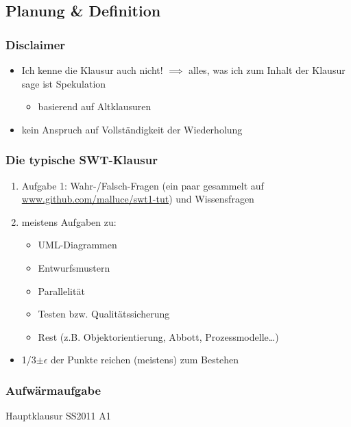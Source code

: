 \documentclass[18pt]{beamer}
\begin{document}
	\subsection{Planung \& Definition}
	\begin{frame}
		\frametitle{Disclaimer}
		\begin{large}
			\begin{itemize}
				\item Ich kenne die Klausur auch nicht! \pause
				\linebreak $\implies$ alles, was ich zum Inhalt der Klausur sage ist Spekulation
				\begin{itemize}
					\item basierend auf Altklausuren \pause
				\end{itemize}
				\item kein Anspruch auf Vollständigkeit der Wiederholung
			\end{itemize}
		\end{large}
	\end{frame}

	\begin{frame}
		\frametitle{Die typische SWT-Klausur}
		\begin{enumerate}
			\item Aufgabe 1: Wahr-/Falsch-Fragen (ein paar gesammelt auf \url{www.github.com/malluce/swt1-tut})
			 und Wissensfragen\pause
			\item meistens Aufgaben zu:
			\begin{itemize}
				\item UML-Diagrammen \pause
				\item Entwurfsmustern \pause
				\item Parallelität \pause
				\item Testen bzw. Qualitätssicherung \pause
				\item Rest (z.B. Objektorientierung, Abbott, Prozessmodelle\dots) \pause
			\end{itemize}
		\end{enumerate}
		\begin{itemize}
			\item 1/3$\pm \epsilon$ der Punkte reichen (meistens) zum Bestehen
		\end{itemize}
	\end{frame}

	\begin{frame}
		\frametitle{Aufwärmaufgabe}
		\begin{huge}
			\centering Hauptklausur SS2011 A1
		\end{huge}
	\end{frame}
\end{document}
